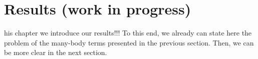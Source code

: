 \chapter{Results (work in progress)}
\label{Chapter:Results}

his chapter we introduce our results!!! To this end, we already can state here the problem of the many-body terms presented in the previous section. Then, we can be more clear in the next section.
